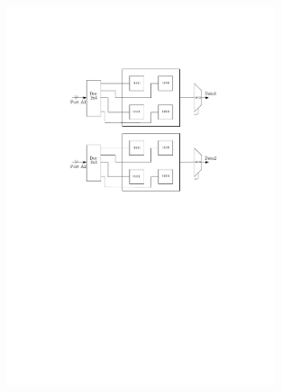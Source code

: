 \documentclass[12pt]{exam}
\begin{document}
\begin{questions}
\begin{figure}[h]
	\centering
	\includegraphics[width=0.7\textwidth]{images/img2/img2.pdf}
\end{figure}














\end{questions}
\end{document}
